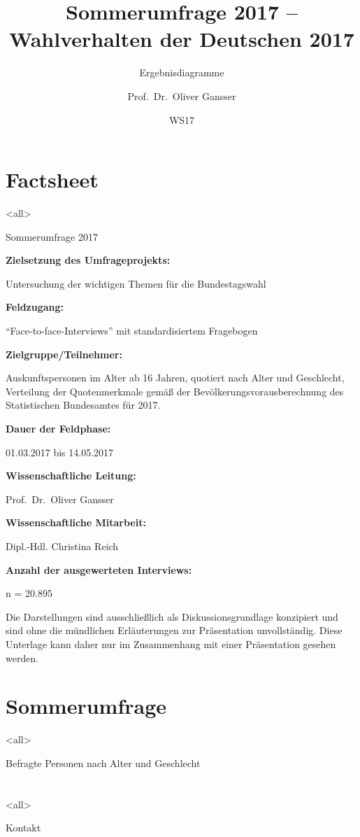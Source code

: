 \documentclass[10pt,ngerman,dvipsnames,ignorenonframetext,]{beamer}
\title{Sommerumfrage 2017 -- Wahlverhalten der Deutschen 2017}
\subtitle{Ergebnisdiagramme}
\author{Prof.~Dr.~Oliver Gansser}
\institute{FOM}
\date{WS17}
\begin{document}
\frame{\titlepage}

\section{Factsheet}\label{factsheet}

\mode<all> \setinversetitle
\mode*

\begin{frame}{Sommerumfrage 2017}

\textbf{Zielsetzung des Umfrageprojekts:}

Untersuchung der wichtigen Themen für die Bundestagswahl

\textbf{Feldzugang:}

``Face-to-face-Interviews'' mit standardisiertem Fragebogen

\textbf{Zielgruppe/Teilnehmer:}

Auskunftspersonen im Alter ab 16 Jahren, quotiert nach Alter und
Geschlecht, Verteilung der Quotenmerkmale gemäß der
Bevölkerungsvorausberechnung des Statistischen Bundesamtes für 2017.

\textbf{Dauer der Feldphase:}

01.03.2017 bis 14.05.2017

\textbf{Wissenschaftliche Leitung:}

Prof.~Dr.~Oliver Gansser

\textbf{Wissenschaftliche Mitarbeit:}

Dipl.-Hdl. Christina Reich

\textbf{Anzahl der ausgewerteten Interviews:}

n = 20.895

\begin{block}{}

Die Darstellungen sind ausschließlich als Diskussionsgrundlage
konzipiert und sind ohne die mündlichen Erläuterungen zur Präsentation
unvollständig. Diese Unterlage kann daher nur im Zusammenhang mit einer
Präsentation gesehen werden.

\end{block}

\end{frame}

\section{Sommerumfrage}\label{sommerumfrage}

\mode<all> \setnormaltitle
\mode*

\begin{frame}{Befragte Personen nach Alter und Geschlecht}

\end{frame}

\section{}\label{section-1}

\mode<all> \setinversetitle
\mode*

\begin{frame}{Kontakt}

\end{frame}
\end{document}
